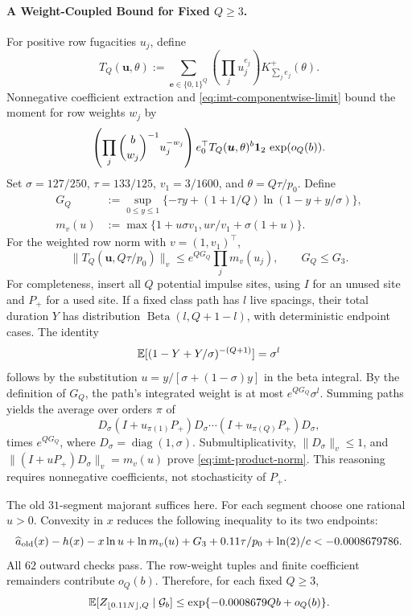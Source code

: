 \paragraph{A Weight-Coupled Bound for Fixed $Q\ge3$.}
For positive row fugacities $u_j$, define
\[
 T_Q(\boldsymbol u,\theta):=\sum_{\boldsymbol e\in\{0,1\}^Q}
 \left(\prod_j u_j^{e_j}\right)K_{\sum_j e_j}^+(\theta).
\]
Nonnegative coefficient extraction and \eqref{eq:imt-componentwise-limit}
bound the moment for row weights $w_j$ by
\[
 \left(\prod_j\binom b{w_j}^{-1}u_j^{-w_j}\right)
 e_0^\top T_Q(\boldsymbol u,\theta)^b\mathbf 1_2\,\exp(o_Q(b)).
\]
Set $\sigma=127/250$, $\tau=133/125$, $v_1=3/1600$, and
$\theta=Q\tau/p_0$. Define
\begin{align*}
 G_Q&:=\sup_{0\le y\le1}\{-\tau y+(1+1/Q)\ln(1-y+y/\sigma)\},\\
 m_v(u)&:=\max\{1+u\sigma v_1,ur/v_1+\sigma(1+u)\}.
\end{align*}
For the weighted row norm with $v=(1,v_1)^\top$,
\begin{equation}
 \|T_Q(\boldsymbol u,Q\tau/p_0)\|_v
 \le e^{QG_Q}\prod_jm_v(u_j),\qquad G_Q\le G_3.
 \label{eq:imt-product-norm}
\end{equation}
For completeness, insert all $Q$ potential impulse sites, using $I$ for
an unused site and $P_+$ for a used site. If a fixed class path has $l$ live
spacings, their total duration $Y$ has distribution
$\operatorname{Beta}(l,Q+1-l)$, with deterministic endpoint cases. The identity
\[
 \mathbb E[(1-Y+Y/\sigma)^{-(Q+1)}]=\sigma^l
\]
follows by the substitution $u=y/[\sigma+(1-\sigma)y]$ in the beta integral.
By the definition of $G_Q$, the path's integrated weight is at most
$e^{QG_Q}\sigma^l$. Summing paths yields the average over orders $\pi$ of
\[
 D_\sigma(I+u_{\pi(1)}P_+)D_\sigma\cdots
 (I+u_{\pi(Q)}P_+)D_\sigma,
\]
times $e^{QG_Q}$, where $D_\sigma=\operatorname{diag}(1,\sigma)$.
Submultiplicativity, $\|D_\sigma\|_v\le1$, and
$\|(I+uP_+)D_\sigma\|_v=m_v(u)$ prove \eqref{eq:imt-product-norm}.
This reasoning requires nonnegative coefficients, not stochasticity of $P_+$.

The old $31$-segment majorant suffices here. For each segment choose one
rational $u>0$. Convexity in $x$ reduces the following inequality to its
two endpoints:
\[
 \widehat a_{\rm old}(x)-h(x)-x\ln u+\ln m_v(u)
 +G_3+0.11\tau/p_0+\ln(2)/c<-0.0008679786.
\]
All $62$ outward checks pass. The row-weight tuples and finite coefficient
remainders contribute $o_Q(b)$. Therefore, for each fixed $Q\ge3$,
\[
 \mathbb E[Z_{\lfloor0.11N\rfloor,Q}\mid\mathcal G_b]
 \le\exp\{-0.0008679Qb+o_Q(b)\}.
\]

